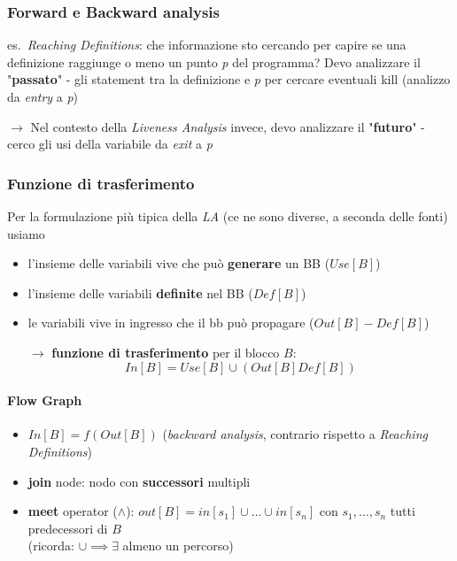 \subsubsection{Forward e Backward analysis}

es.~\textit{Reaching Definitions}: che informazione sto cercando per capire se una definizione raggiunge o meno un punto \textit{p} del programma? Devo analizzare il "\textbf{passato}" - gli statement tra la definizione e \textit{p} per cercare eventuali kill (analizzo da \textit{entry} a \textit{p})

\noindent $\rightarrow$ Nel contesto della \textit{Liveness Analysis} invece, devo analizzare il "\textbf{futuro}" - cerco gli usi della variabile da \textit{exit} a \textit{p}

\subsubsection{Funzione di trasferimento}

Per la formulazione pi\`u tipica della \textit{LA} (ce ne sono diverse, a seconda delle fonti) usiamo
\begin{itemize}
  \item l'insieme delle variabili vive che pu\`o \textbf{generare} un BB ($Use[B]$)
  \item l'insieme delle variabili \textbf{definite} nel BB ($Def[B]$)
  \item le variabili vive in ingresso che il bb pu\`o propagare ($Out[B] - Def[B]$)
  \item[$\rightarrow$] \textbf{funzione di trasferimento} per il blocco $B$:
    \begin{equation*}
      In[B] = Use[B] \cup (Out[B] Def[B]) 
    \end{equation*}
\end{itemize}

\paragraph{Flow Graph}

\begin{itemize}
  \item $In[B] = f(Out[B])$ (\textit{backward analysis}, contrario rispetto a \textit{Reaching Definitions})
  \item \textbf{join} node: nodo con \textbf{successori} multipli
  \item \textbf{meet} operator ($\wedge$): $out[B] = in[s_1] \cup \ldots \cup in[s_n]$ con $s_1,\ldots,s_n$ tutti predecessori di $B$\\
    (ricorda: $\cup \implies \exists$ almeno un percorso)
\end{itemize}

